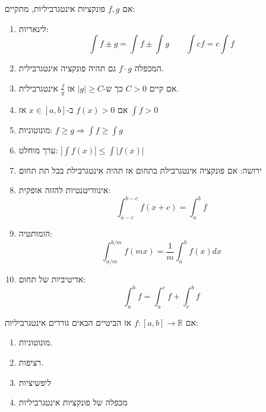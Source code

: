 \documentclass{tstextbook}
\begin{document}
\begin{proposition}
אם \(f,g\) פונקציות אינטגרביליות, מתקיים:

\end{proposition}
\begin{enumerate}
  \item לינאריות:\\
$$\int f\pm g=\int f \pm \int g\qquad \int c f =c\int f$$


  \item המכפלה \(f\cdot g\) גם תהיה פונקציה אינטגרבילית. 


  \item אם קיים \(C>0\) כך ש-\(|g|\geq C\) אז \(\frac{f}{g}\) אינטגרבילית. 


  \item אם \(f(x)>0\) ב-\(x\in[a,b]\) אז \(\int f >0\)


  \item מונוטוניות: \(f\geq g\Rightarrow \int f \geq \int g\)


  \item ערך מוחלט: \(\left| \int f(x) \right|\leq \int\left| f(x)\right|\)


  \item ירושה: אם פונקציה אינטגרבילת בתחום אז תהיה אינטגרבילת בכל תת תחום 


  \item אינווריטנטיות להזזה אופקית:\\
$$\int_{a-c}^{b-c} f(x+c) = \int_a^b f$$


  \item הומותטיה:\\
$$\int_{a/m}^{b/m} f(mx)=\frac{1}{m}\int_a^b f(x) dx$$


  \item אדיטיביות של תחום: 
$$\int_a^b f = \int_a^c f + \int_c^b f$$


\end{enumerate}
\begin{proposition}
אם \(f:[a,b]\to \mathbb{R}\) אז הביטיים הבאים גוררים אינטגרביליות:

\end{proposition}
\begin{enumerate}
  \item מונוטוניות. 


  \item רציפות. 


  \item ליפשיציות 


  \item מכפלה של פונקציות אינטגרביליות 


\end{enumerate}
\end{document}
